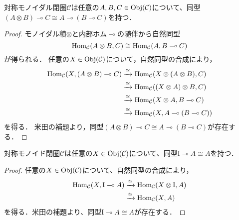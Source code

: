 \documentclass[type_judgement.tex]{subfiles}
\begin{document}
\begin{prop}
\label{prop:mc_adj}
対称モノイダル閉圏$\mathcal{C}$は任意の$A,B,C\in\mathop{\mathrm{Obj}}\nolimits(\mathcal{C})$について、同型$(A \otimes B) \multimap C \cong A \multimap (B \multimap C)$を持つ．
\end{prop}
\begin{proof}
モノイダル積$\otimes$と内部ホム$\multimap$の随伴から自然同型
\begin{equation*}
    \mathop{\mathrm{Hom}}\nolimits_\mathcal{C}(A \otimes B, C) \cong \mathop{\mathrm{Hom}}\nolimits_\mathcal{C}(A, B \multimap C)
\end{equation*}
が得られる．
任意の$X\in\mathop{\mathrm{Obj}}\nolimits(\mathcal{C})$について，自然同型の合成により，
\begin{align*}
    \mathop{\mathrm{Hom}}\nolimits_\mathcal{C}(X, (A \otimes B) \multimap C) &\xrightarrow{\cong} \mathop{\mathrm{Hom}}\nolimits_\mathcal{C}(X \otimes (A \otimes B), C) \\
     &\xrightarrow{\cong} \mathop{\mathrm{Hom}}\nolimits_\mathcal{C}((X \otimes A) \otimes B, C) \\
     &\xrightarrow{\cong} \mathop{\mathrm{Hom}}\nolimits_\mathcal{C}(X \otimes A, B \multimap C) \\
     &\xrightarrow{\cong} \mathop{\mathrm{Hom}}\nolimits_\mathcal{C}(X, A \multimap (B \multimap C))
\end{align*}
を得る．
米田の補題より，同型$(A \otimes B) \multimap C \cong A \multimap (B \multimap C)$が存在する．
\end{proof}

\begin{prop}
\label{prop:unit}
対称モノイド閉圏$\mathcal{C}$は任意の$X\in\mathop{\mathrm{Obj}}\nolimits(\mathcal{C})$について、同型$\mathrm{I} \multimap A \cong A$を持つ．
\end{prop}
\begin{proof}
任意の$X\in\mathop{\mathrm{Obj}}\nolimits(\mathcal{C})$について、自然同型の合成により，
\begin{align*}
    \mathop{\mathrm{Hom}}\nolimits_\mathcal{C}(X, \mathrm{I} \multimap A) &\xrightarrow{\cong} \mathop{\mathrm{Hom}}\nolimits_\mathcal{C}(X \otimes \mathrm{I}, A) \\
    &\xrightarrow{\cong} \mathop{\mathrm{Hom}}\nolimits_\mathcal{C}(X, A)
\end{align*}
を得る．米田の補題より、同型$\mathrm{I} \multimap A \cong A$が存在する．
\end{proof}
\end{document}
